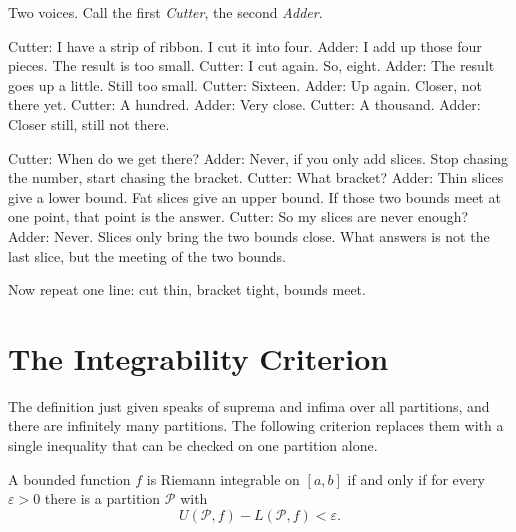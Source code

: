 

\begin{bacakeras}
Two voices. Call the first \emph{Cutter}, the second \emph{Adder}.

Cutter: I have a strip of ribbon. I cut it into four.
Adder: I add up those four pieces. The result is too small.
Cutter: I cut again. So, eight.
Adder: The result goes up a little. Still too small.
Cutter: Sixteen.
Adder: Up again. Closer, not there yet.
Cutter: A hundred.
Adder: Very close.
Cutter: A thousand.
Adder: Closer still, still not there.

Cutter: When do we get there?
Adder: Never, if you only add slices. Stop chasing the number,
start chasing the bracket.
Cutter: What bracket?
Adder: Thin slices give a lower bound. Fat slices give an upper
bound. If those two bounds meet at one point, that point is the answer.
Cutter: So my slices are never enough?
Adder: Never. Slices only bring the two bounds close. What answers
is not the last slice, but the meeting of the two bounds.

Now repeat one line: cut thin, bracket tight, bounds meet.
\end{bacakeras}

\section{The Integrability Criterion}

The definition just given speaks of suprema and infima over all partitions, and there are infinitely
many partitions. The following criterion replaces them with a single inequality that
can be checked on one partition alone.

\begin{teorema}
A bounded function $f$ is Riemann integrable on $[a,b]$ if and only if for
every $\varepsilon>0$ there is a partition $\mathcal{P}$ with
\[
U(\mathcal{P},f)-L(\mathcal{P},f)<\varepsilon .
\]
\end{teorema}

